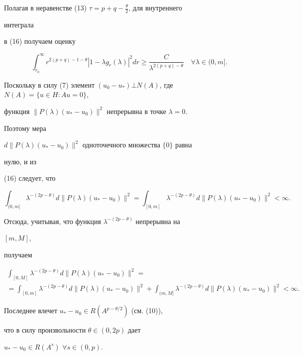 \begin{pf}
\begin{equation}
\end{equation} 


Полагая в неравенстве (13) $\tau=p+q-\frac{\theta}{2}$, для внутреннего 


интеграла 


в (16) получаем оценку 


$$ 


\int^\infty_{r_0}r^{2(p+q)-1-\theta} 


|1-\lambda g_r(\lambda)|^2d r\ge 


\frac{C}{\lambda^{2(p+q)-\theta}}\quad \forall\lambda\in(0,m]. 


$$ 


Поскольку в силу (7) элемент $(u_0-u_*)\bot N(A)$, где $N(A)=\{u\in H: 


Au=0\}$, 


функция $\|P(\lambda)(u_*-u_0)\|^2$ непрерывна в точке $\lambda=0$. 


Поэтому мера 


$d\|P(\lambda)(u_*-u_0)\|^2$ одноточечного множества $\{0\}$ равна 


нулю, и из 


(16) следует, что 


$$ 


\int_{(0,m]}\lambda^{-(2p-\theta)} 


d\|P(\lambda)(u_*-u_0)\|^2= 


\int_{[0,m]}\lambda^{-(2p-\theta)} 


d\|P(\lambda)(u_*-u_0)\|^2<\infty. 


$$ 


Отсюда, учитывая, что функция $\lambda^{-(2p-\theta)}$ непрерывна на 


$[m,M]$, 


получаем 


\begin{multline*}


\int_{[0,M]}\lambda^{-(2p-\theta)}d\|P(\lambda)(u_*-u_0)\|^2= \\


%


=\int_{[0,m]}\lambda^{-(2p-\theta)} 


d\|P(\lambda)(u_*-u_0)\|^2+ 


\int_{(m,M]}\lambda^{-(2p-\theta)}d 


\|P(\lambda)(u_*-u_0)\|^2<\infty. 


\end{multline*}


Последнее влечет $u_*-u_0\in R(A^{p-\theta/2})$ (см. (10)), 


что в силу произвольности $\theta\in(0,2p)$ дает 


$u_*-u_0\in R(A^s)$ $\forall s\in(0,p)$. 


\end{pf} 


